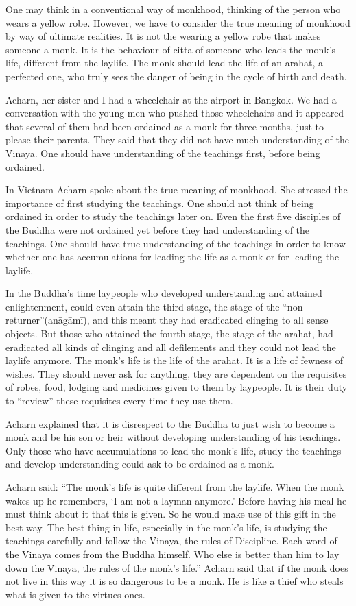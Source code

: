 One may think in a conventional way of monkhood, thinking of the person
who wears a yellow robe. However, we have to consider the true meaning
of monkhood by way of ultimate realities. It is not the wearing a yellow
robe that makes someone a monk. It is the behaviour of citta of someone
who leads the monk's life, different from the laylife. The monk should
lead the life of an arahat, a perfected one, who truly sees the danger
of being in the cycle of birth and death.

Acharn, her sister and I had a wheelchair at the airport in Bangkok. We
had a conversation with the young men who pushed those wheelchairs and
it appeared that several of them had been ordained as a monk for three
months, just to please their parents. They said that they did not have
much understanding of the Vinaya. One should have understanding of the
teachings first, before being ordained.

In Vietnam Acharn spoke about the true meaning of monkhood. She stressed
the importance of first studying the teachings. One should not think of
being ordained in order to study the teachings later on. Even the first
five disciples of the Buddha were not ordained yet before they had
understanding of the teachings. One should have true understanding of
the teachings in order to know whether one has accumulations for leading
the life as a monk or for leading the laylife.

In the Buddha's time laypeople who developed understanding and attained
enlightenment, could even attain the third stage, the stage of the
``non-returner''(anāgāmī), and this meant they had eradicated clinging
to all sense objects. But those who attained the fourth stage, the stage
of the arahat, had eradicated all kinds of clinging and all defilements
and they could not lead the laylife anymore. The monk's life is the life
of the arahat. It is a life of fewness of wishes. They should never ask
for anything, they are dependent on the requisites of robes, food,
lodging and medicines given to them by laypeople. It is their duty to
``review'' these requisites every time they use them.

Acharn explained that it is disrespect to the Buddha to just wish to
become a monk and be his son or heir without developing understanding of
his teachings. Only those who have accumulations to lead the monk's
life, study the teachings and develop understanding could ask to be
ordained as a monk.

Acharn said: ``The monk's life is quite different from the laylife. When
the monk wakes up he remembers, `I am not a layman anymore.' Before
having his meal he must think about it that this is given. So he would
make use of this gift in the best way. The best thing in life,
especially in the monk's life, is studying the teachings carefully and
follow the Vinaya, the rules of Discipline. Each word of the Vinaya
comes from the Buddha himself. Who else is better than him to lay down
the Vinaya, the rules of the monk's life.'' Acharn said that if the monk
does not live in this way it is so dangerous to be a monk. He is like a
thief who steals what is given to the virtues ones.

